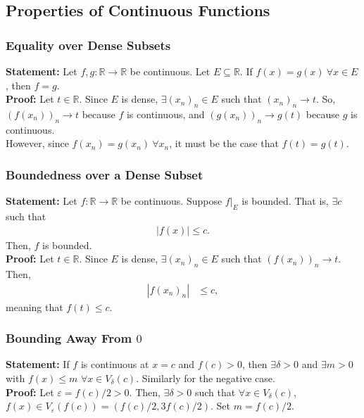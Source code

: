 \documentclass[10pt]{extarticle}
\newcommand{\R}{\mathbb{R}}
\begin{document}
  \subsection{Properties of Continuous Functions}%
  \subsubsection{Equality over Dense Subsets}%
    \textbf{Statement:} Let $f,g: \R\rightarrow\R$ be continuous. Let $E\subseteq \R$. If $f(x) = g(x)~\forall x\in E$, then $f = g$.\\

    \textbf{Proof:} Let $t\in\R$. Since $E$ is dense, $\exists (x_n)_n \in E$ such that $(x_n)_n \rightarrow t$. So, $(f(x_n))_n \rightarrow t$ because $f$ is continuous, and $(g(x_n))_n \rightarrow g(t)$ because $g$ is continuous.\\

    However, since $f(x_n) = g(x_n)~\forall x_n$, it must be the case that $f(t) = g(t)$.
    \subsubsection{Boundedness over a Dense Subset}%
    \textbf{Statement:} Let $f: \R \rightarrow \R$ be continuous. Suppose $f\vert_{E}$ is bounded. That is, $\exists c$ such that
    \begin{align*}
      |f(x)| \leq c.\tag*{$\forall x\in E$}
    \end{align*}
    Then, $f$ is bounded.\\

    \textbf{Proof:} Let $t\in \R$. Since $E$ is dense, $\exists (x_n)_n \in E$ such that $(f(x_n))_n \rightarrow t$. Then,
    \begin{align*}
      |f(x_n)_n| &\leq c,
    \end{align*}
    meaning that $f(t) \leq c$.
    \subsubsection{Bounding Away From $0$}%
    \textbf{Statement:} If $f$ is continuous at $x=c$ and $f(c) > 0$, then $\exists \delta > 0$ and $\exists m > 0$ with $f(x) \leq m$ $\forall x \in V_{\delta}(c)$. Similarly for the negative case.\\

    \textbf{Proof:} Let $\varepsilon = f(c) / 2 > 0$. Then, $\exists \delta > 0$ such that $\forall x\in V_{\delta}(c)$, $f(x)\in V_{\varepsilon}(f(c)) = (f(c)/2,3f(c)/2)$. Set $m = f(c)/2$. 
\end{document}
